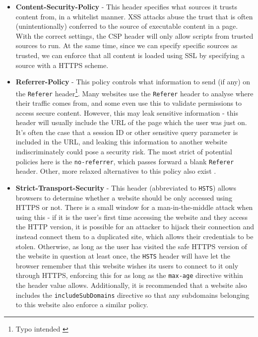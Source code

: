\begin{itemize}
	\item \textbf{Content-Security-Policy} - This header specifies what sources it trusts content from, in a whitelist manner. XSS attacks abuse the trust that is often (unintentionally) conferred to the source of executable content in a page. With the correct settings, the CSP header will only allow scripts from trusted sources to run. At the same time, since we can specify specific sources as trusted, we can enforce that all content is loaded using SSL by specifying a source with a HTTPS scheme.
	
	\item \textbf{Referrer-Policy} - This policy controls what information to send (if any) on the \texttt{Referer} header\footnote{ Typo intended \cite{refererHeader}}. Many websites use the \texttt{Referer} header to analyse where their traffic comes from, and some even use this to validate permissions to access secure content. However, this may leak sensitive information - this header will usually include the URL of the page which the user was just on. It's often the case that a session ID or other sensitive query parameter is included in the URL, and leaking this information to another website indiscriminately could pose a security risk. The most strict of potential policies here is the \texttt{no-referrer}, which passes forward a blank \texttt{Referer} header. Other, more relaxed alternatives to this policy also exist \cite{referrerPolicy}.
	
	\item \textbf{Strict-Transport-Security} - 	This header (abbreviated to \texttt{HSTS}) allows browsers to determine whether a website should be only accessed using HTTPS or not. There is a small window for a man-in-the-middle attack when using this - if it is the user's first time accessing the website and they access the HTTP version, it is possible for an attacker to hijack their connection and instead connect them to a duplicated site, which allows their credentials to be stolen. Otherwise, as long as the user has visited the safe HTTPS version of the website in question at least once, the \texttt{HSTS} header will have let the browser remember that this website wishes its users to connect to it only through HTTPS, enforcing this for as long as the \texttt{max-age} directive within the header value allows. Additionally, it is recommended that a website also includes the \texttt{includeSubDomains} directive so that any subdomains belonging to this website also enforce a similar policy.
	

\end{itemize}
